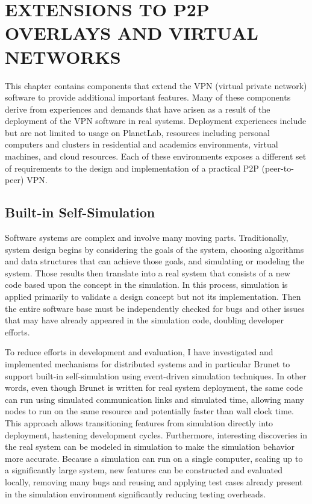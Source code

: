 \chapter{EXTENSIONS TO P2P OVERLAYS AND VIRTUAL NETWORKS}
\label{chap:extensions}

This chapter contains components that extend the VPN (virtual private network)
software to provide additional important features.  Many of these components
derive from experiences and demands that have arisen as a result of the
deployment of the VPN software in real systems.  Deployment experiences include
but are not limited to usage on PlanetLab, resources including personal
computers and clusters in residential and academics environments, virtual
machines, and cloud resources.  Each of these environments exposes a different
set of requirements to the design and implementation of a practical P2P
(peer-to-peer) VPN.

\section{Built-in Self-Simulation}

Software systems are complex and involve many moving parts.  Traditionally,
system design begins by considering the goals of the system, choosing
algorithms and data structures that can achieve those goals, and simulating or
modeling the system.  Those results then translate into a real system that
consists of a new code based upon the concept in the simulation.  In this
process, simulation is applied primarily to validate a design concept but not
its implementation.  Then the entire software base must be independently
checked for bugs and other issues that may have already appeared in the
simulation code, doubling developer efforts.  

To reduce efforts in development and evaluation, I have investigated and
implemented mechanisms for distributed systems and in particular Brunet to
support built-in self-simulation using event-driven simulation techniques.  In
other words, even though Brunet is written for real system deployment, the same
code can run using simulated communication links and simulated time, allowing
many nodes to run on the same resource and potentially faster than wall clock
time.  This approach allows transitioning features from simulation directly
into deployment, hastening development cycles.  Furthermore, interesting
discoveries in the real system can be modeled in simulation to make the
simulation behavior more accurate.  Because a simulation can run on a single
computer, scaling up to a significantly large system, new features can be
constructed and evaluated locally, removing many bugs and reusing and applying
test cases already present in the simulation environment significantly reducing
testing overheads.

